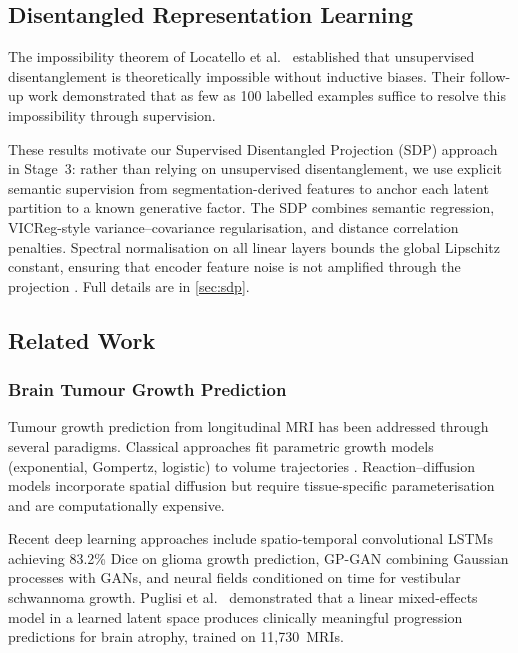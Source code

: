 \subsection{Disentangled Representation Learning}
\label{sec:bg:disentanglement}

The impossibility theorem of Locatello et al.\ \cite{locatello2019challenging}
established that unsupervised disentanglement is theoretically impossible
without inductive biases. Their follow-up work
\cite{locatello2020disentangling} demonstrated that as few as 100 labelled
examples suffice to resolve this impossibility through supervision.

These results motivate our Supervised Disentangled Projection (SDP) approach
in Stage~3: rather than relying on unsupervised disentanglement, we use
explicit semantic supervision from segmentation-derived features to anchor
each latent partition to a known generative factor. The SDP combines semantic
regression, VICReg-style \cite{bardes2022vicreg} variance--covariance
regularisation, and distance correlation \cite{szekely2007measuring}
penalties. Spectral normalisation \cite{miyato2018spectral} on all linear
layers bounds the global Lipschitz constant, ensuring that encoder feature
noise is not amplified through the projection
\cite{gouk2021regularisation}. Full details are in \cref{sec:sdp}.

\subsection{Related Work}
\label{sec:bg:related}

\subsubsection{Brain Tumour Growth Prediction}

Tumour growth prediction from longitudinal MRI has been addressed through
several paradigms. Classical approaches fit parametric growth models
(exponential, Gompertz, logistic) to volume trajectories
\cite{nakasu2005serial,hashimoto2012natural}. Reaction--diffusion models
\cite{swanson2000quantitative,hormuth2021image} incorporate spatial diffusion
but require tissue-specific parameterisation and are computationally expensive.

Recent deep learning approaches include spatio-temporal convolutional LSTMs
\cite{zhang2020spatio} achieving 83.2\% Dice on glioma growth prediction,
GP-GAN \cite{elazab2020gp} combining Gaussian processes with GANs, and neural
fields conditioned on time \cite{chen2024vestibular} for vestibular schwannoma
growth. Puglisi et al.\ \cite{puglisi2025brain} demonstrated that a linear
mixed-effects model in a learned latent space produces clinically meaningful
progression predictions for brain atrophy, trained on 11,730~MRIs.

